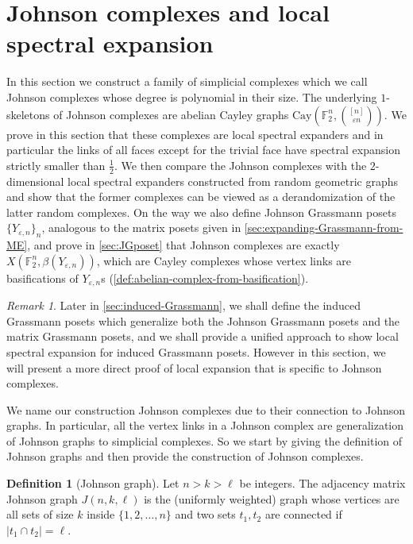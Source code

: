 \documentclass[10pt,a4paper]{article}
\newcommand{\prettyref}[1]{\cref{#1}}
\theoremstyle{definition}
\newtheorem{definition}[theorem]{Definition}
\theoremstyle{remark}
\newtheorem{remark}[theorem]{Remark}
\newcommand{\abs}[1]{\lvert#1\rvert}
\newcommand{\set}[1]{\{#1\}}
\newcommand{\F}{\mathbb{F}}
\numberwithin{equation}{section}
\let\pref=\prettyref
\def\S{X}
\begin{document}
\newcommand{\0}[0]{\mathbf{0}}
\newcommand{\ot}[0]{\cap}
\newcommand{\co}[1]{C_{#1}} 
\newcommand{\sym}[1]{T_{#1}} 
\newcommand{\oco}[1]{\overline{C_{#1}}} 
\newcommand{\ol}[1]{\overline{#1}}
\newcommand{\cd}[1]{c_{#1}}
\newcommand{\dc}[1]{T_{#1}}


\section{Johnson complexes and local spectral expansion}
\label{sec:spectral-Johnson}
In this section we construct a family of simplicial complexes which we call Johnson complexes whose degree is polynomial in their size. 
The underlying $1$-skeletons of Johnson complexes are abelian Cayley graphs $\mathrm{Cay}(\mathbb{F}_2^n, \binom{[n]}{\varepsilon n})$. 
We prove in this section that these complexes are local spectral expanders and in particular the links of all faces except for the trivial face have spectral expansion strictly smaller than $\frac{1}{2}$.
%
We then compare the Johnson complexes with the $2$-dimensional local spectral expanders constructed from random geometric graphs \cite{LiuMSY2023} and show that the former complexes can be viewed as a derandomization of the latter random complexes.
%
On the way we also define Johnson Grassmann posets $\set{Y_{\varepsilon,n}}_n$, analogous to the matrix posets given in \pref{sec:expanding-Grassmann-from-ME}, and prove in \pref{sec:JGposet} that Johnson complexes are exactly $\S(\F_2^n, \beta(Y_{\varepsilon,n}))$, which are Cayley complexes whose vertex links are basifications of $Y_{\varepsilon,n}$s (\pref{def:abelian-complex-from-basification}). 
\begin{remark}
    Later in \pref{sec:induced-Grassmann}, we shall define the induced Grassmann posets which generalize both the Johnson Grassmann posets and the matrix Grassmann posets, and we shall provide a unified approach to show local spectral expansion for induced Grassmann posets. However in this section, we will present a more direct proof of local expansion that is specific to Johnson complexes.
\end{remark}
%
We name our construction Johnson complexes due to their connection to Johnson graphs. In particular, all the vertex links in a Johnson complex are generalization of Johnson graphs to simplicial complexes. So we start by giving the definition of Johnson graphs and then provide the construction of Johnson complexes.


\begin{definition}[Johnson graph] \label{def:johnson-graph}
    Let \(n>k>\ell\) be integers. The adjacency matrix Johnson graph \(J(n,k,\ell)\) is the (uniformly weighted) graph whose vertices are all sets of size \(k\) inside \(\set{1,2,\dots,n}\) and two sets \(t_1,t_2\) are connected if \(\abs{t_1 \cap t_2} = \ell\).
\end{definition}
\end{document}
